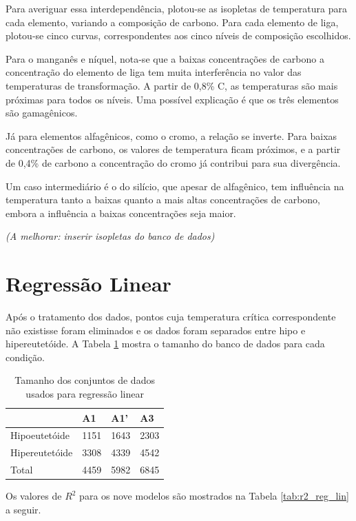 \documentclass[brazil,tf,epusp]{usp}  %
\begin{document}
Para averiguar essa interdependência, plotou-se as isopletas de temperatura para cada elemento, variando a composição de carbono. Para cada elemento de liga, plotou-se cinco curvas, correspondentes aos cinco níveis de composição escolhidos.

Para o manganês e níquel, nota-se que a baixas concentrações de carbono a concentração do elemento de liga tem muita interferência no valor das temperaturas de transformação. A partir de 0,8\% C, as temperaturas são mais próximas para todos os níveis. Uma possível explicação é que os três elementos são gamagênicos.

Já para elementos alfagênicos, como o cromo, a relação se inverte. Para baixas concentrações de carbono, os valores de temperatura ficam próximos, e a partir de 0,4\% de carbono a concentração do cromo já contribui para sua divergência.

Um caso intermediário é o do silício, que apesar de alfagênico, tem influência na temperatura tanto a baixas quanto a mais altas concentrações de carbono, embora a influência a baixas concentrações seja maior.

\textit{(A melhorar: inserir isopletas do banco de dados)}

\section{Regressão Linear}

Após o tratamento dos dados, pontos cuja temperatura crítica correspondente não existisse foram eliminados e os
dados foram separados entre hipo e hipereutetóide. A Tabela \ref{tab:conj_dados} mostra o tamanho do banco de dados para cada condição.

\begin{table}
  \caption{Tamanho dos conjuntos de dados usados para regressão linear}

  \begin{tabular}{llll}
  \hline
                 & A1   & A1'  & A3   \\
  \hline
  Hipoeutetóide  & 1151 & 1643 & 2303 \\
  Hipereutetóide & 3308 & 4339 & 4542 \\
  Total          & 4459 & 5982 & 6845 \\
  \hline
  \end{tabular}

  \label{tab:conj_dados}
\end{table}

Os valores de $R^{2}$ para os nove modelos são mostrados na Tabela \ref{tab:r2_reg_lin} a seguir.
\end{document}
